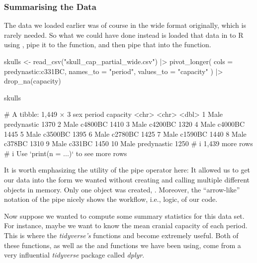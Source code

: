 \subsubsection{Summarising the Data}

The  data we loaded earlier was of course in the wide format originally, which is rarely needed. So what we could have done instead is loaded that data in to R using , pipe it to the  function, and then pipe that into the  function.

\begin{inR}
skulls <- read_csv("skull_cap_partial_wide.csv") |>
  pivot_longer(
    cols = predynastic:c331BC,
    names_to = "period",
    values_to = "capacity"
  ) |>
  drop_na(capacity)

skulls
\end{inR}
\begin{outR}
# A tibble: 1,449 × 3
   sex   period      capacity
   <chr> <chr>          <dbl>
 1 Male  predynastic     1370
 2 Male  c4800BC         1410
 3 Male  c4200BC         1320
 4 Male  c4000BC         1445
 5 Male  c3500BC         1395
 6 Male  c2780BC         1425
 7 Male  c1590BC         1440
 8 Male  c378BC          1310
 9 Male  c331BC          1450
10 Male  predynastic     1250
# i 1,439 more rows
# i Use `print(n = ...)` to see more rows
\end{outR}

It is worth emphasizing the utility of the pipe operator here: It allowed us to get our data into the form we wanted without creating and calling multiple different objects in memory. Only one object was created, . Moreover, the ``arrow-like'' notation of the pipe \R{|>} nicely shows the workflow, i.e., logic, of our code.

Now suppose we wanted to compute some summary statistics for this data set.  For instance, maybe we want to know the mean cranial capacity of each period. This is where the \textit{tidyverse's} functions  and  become extremely useful. Both of these functions, as well as the  and  functions we have been using, come from a very influential \textit{tidyverse} package called \textit{dplyr}. 

